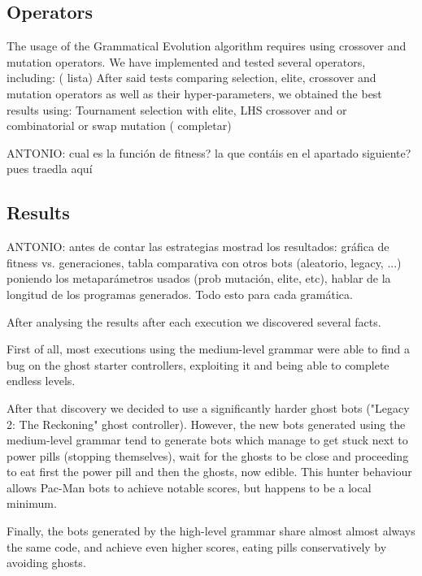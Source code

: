 \documentclass{llncs}
\newcommand{\pacman}{Ms. Pac-Man vs. Ghosts }
\newcommand{\paco}{Pac-Man }
\begin{document}
\subsection{Operators}
The usage of the Grammatical Evolution algorithm requires using crossover and mutation operators. We have implemented and tested several operators, including: ({\color{red} lista})
After said tests comparing selection, elite, crossover and mutation operators as well as their hyper-parameters, we obtained the best results using: Tournament selection with elite, LHS crossover and or combinatorial or swap mutation ({\color{red} completar})

{\color{red}ANTONIO: cual es la función de fitness? la que contáis en el apartado siguiente? pues traedla aquí}

\subsection{Results}

{\color{red}ANTONIO: antes de contar las estrategias mostrad los resultados: gráfica de fitness vs. generaciones, tabla comparativa con otros bots (aleatorio, legacy, ...) poniendo los metaparámetros usados (prob mutación, elite, etc), hablar de la longitud de los programas generados. Todo esto para cada gramática. }

After analysing the results after each execution we discovered several facts. 

First of all, most executions using the medium-level grammar were able to find a bug on the ghost starter controllers, exploiting it and being able to complete endless levels.

After that discovery we decided to use a significantly harder ghost bots ("Legacy 2: The Reckoning" ghost controller). However, the new bots generated using the medium-level grammar tend to generate bots which manage to get stuck next to power pills (stopping themselves), wait for the ghosts to be close and proceeding to eat first the power pill and then the ghosts, now edible. This hunter behaviour allows \paco bots to achieve notable scores, but happens to be a local minimum.

Finally, the bots generated by the high-level grammar share almost almost always the same code, and achieve even higher scores, eating pills conservatively by avoiding ghosts.

\end{document}
